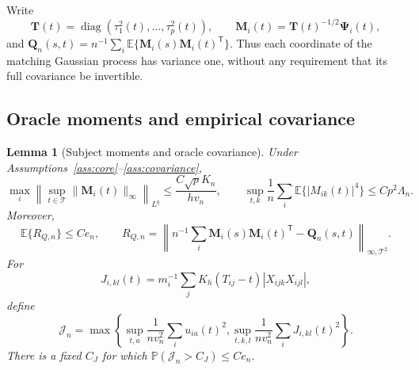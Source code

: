 \documentclass[10pt]{book}
\newtheorem{lemma}{Lemma}
\newcommand{\bM}{{\mathbf M}}
\newcommand{\bQ}{{\mathbf Q}}
\newcommand{\bT}{{\mathbf T}}
\newcommand{\bPsi} {\boldsymbol{\Psi}}
\newcommand{\expect}{\mathbb{E}}
\newcommand{\prob}{\mathbb{P}}
\newcommand{\trans}{{\scriptscriptstyle\mathsf{T}}}
\numberwithin{equation}{section}
\begin{document}
Write
\[
\bT(t)=\operatorname{diag}(\tau_1^2(t),\ldots,\tau_p^2(t)),\qquad
\bM_i(t)=\bT(t)^{-1/2}\bPsi_i(t),
\]
and $\bQ_n(s,t)=n^{-1}\sum_i\expect\{\bM_i(s)\bM_i(t)^\trans\}$.
Thus each coordinate of the matching Gaussian process has variance
one, without any requirement that its full covariance be invertible.

\subsection{Oracle moments and empirical covariance}

\begin{lemma}[Subject moments and oracle covariance]
\label{lem:hd-oracle-covariance}
Under Assumptions~\ref{ass:core}--\ref{ass:covariance},
\[
\max_i\left\|\sup_{t\in\mathcal T}\|\bM_i(t)\|_\infty
\right\|_{L^q}\le\frac{C\sqrt p K_n}{hv_n},\qquad
\sup_{t,k}\frac1n\sum_i\expect\{|M_{ik}(t)|^4\}
\le Cp^2\Lambda_n.
\]
Moreover,
\[
\expect\{R_{Q,n}\}\le Ce_n,\qquad
R_{Q,n}=\left\|n^{-1}\sum_i\bM_i(s)\bM_i(t)^\trans
-\bQ_n(s,t)\right\|_{\infty,\mathcal T^2}.
\]
For
\[
J_{i,kl}(t)=m_i^{-1}\sum_jK_h(T_{ij}-t)|X_{ijk}X_{ijl}|,
\]
define
\[
\mathcal J_n=\max\left\{
\sup_{t,a}\frac1{nv_n^2}\sum_i u_{ia}(t)^2,
\sup_{t,k,l}\frac1{nv_n^2}\sum_iJ_{i,kl}(t)^2\right\}.
\]
There is a fixed $C_J$ for which
$\prob(\mathcal J_n>C_J)\le Ce_n$.
\end{lemma}
\end{document}
